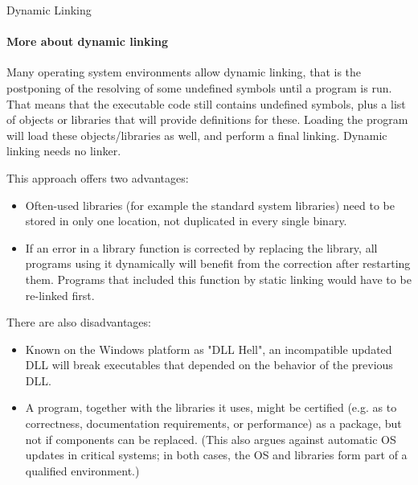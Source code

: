 \begin{frame}{Dynamic Linking}
  \begin{center}
  \end{center}
\end{frame}

\paragraph{More about dynamic linking}

Many operating system environments allow dynamic linking, that is the postponing of the
resolving of some undefined symbols until a program is run. That means that the executable
code still contains undefined symbols, plus a list of objects or libraries that will
provide definitions for these. Loading the program will load these objects/libraries as
well, and perform a final linking. Dynamic linking needs no linker.

This approach offers two advantages:
\begin{itemize}
\item Often-used libraries (for example the standard system libraries) need to be stored
  in only one location, not duplicated in every single binary.
\item If an error in a library function is corrected by replacing the library, all
  programs using it dynamically will benefit from the correction after restarting
  them. Programs that included this function by static linking would have to be re-linked
  first.
\end{itemize}

There are also disadvantages:
\begin{itemize}
\item Known on the Windows platform as "DLL Hell", an incompatible updated DLL will break
  executables that depended on the behavior of the previous DLL.
\item A program, together with the libraries it uses, might be certified (e.g. as to
  correctness, documentation requirements, or performance) as a package, but not if
  components can be replaced. (This also argues against automatic OS updates in critical
  systems; in both cases, the OS and libraries form part of a qualified environment.)
\end{itemize}


